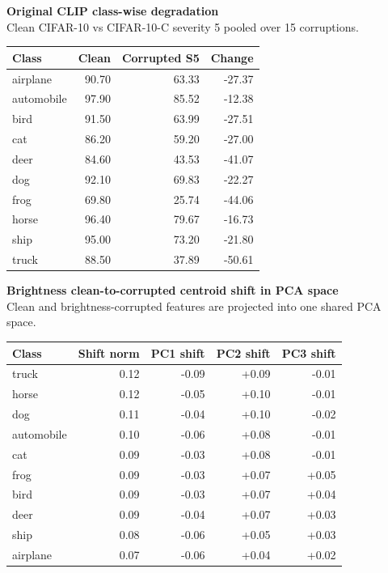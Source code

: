 \documentclass[11pt]{article}
\begin{document}
\clearpage
\begin{center}
{\Large\bfseries Original CLIP class-wise degradation}\\[-0.5mm]
{\normalsize Clean CIFAR-10 vs CIFAR-10-C severity 5 pooled over 15 corruptions.}
\end{center}
\vspace{1mm}
{\scriptsize
\begin{tabular}{lrrr}
\toprule
Class & Clean & Corrupted S5 & Change \\
\midrule
airplane & 90.70 & 63.33 & -27.37 \\
automobile & 97.90 & 85.52 & -12.38 \\
bird & 91.50 & 63.99 & -27.51 \\
cat & 86.20 & 59.20 & -27.00 \\
deer & 84.60 & 43.53 & -41.07 \\
dog & 92.10 & 69.83 & -22.27 \\
frog & 69.80 & 25.74 & -44.06 \\
horse & 96.40 & 79.67 & -16.73 \\
ship & 95.00 & 73.20 & -21.80 \\
truck & 88.50 & 37.89 & -50.61 \\
\bottomrule
\end{tabular}
}

\clearpage
\begin{center}
{\Large\bfseries Brightness clean-to-corrupted centroid shift in PCA space}\\[-0.5mm]
{\normalsize Clean and brightness-corrupted features are projected into one shared PCA space.}
\end{center}
\vspace{1mm}
{\scriptsize
\begin{tabular}{lrrrr}
\toprule
Class & Shift norm & PC1 shift & PC2 shift & PC3 shift \\
\midrule
truck & 0.12 & -0.09 & +0.09 & -0.01 \\
horse & 0.12 & -0.05 & +0.10 & -0.01 \\
dog & 0.11 & -0.04 & +0.10 & -0.02 \\
automobile & 0.10 & -0.06 & +0.08 & -0.01 \\
cat & 0.09 & -0.03 & +0.08 & -0.01 \\
frog & 0.09 & -0.03 & +0.07 & +0.05 \\
bird & 0.09 & -0.03 & +0.07 & +0.04 \\
deer & 0.09 & -0.04 & +0.07 & +0.03 \\
ship & 0.08 & -0.06 & +0.05 & +0.03 \\
airplane & 0.07 & -0.06 & +0.04 & +0.02 \\
\bottomrule
\end{tabular}
}
\end{document}
